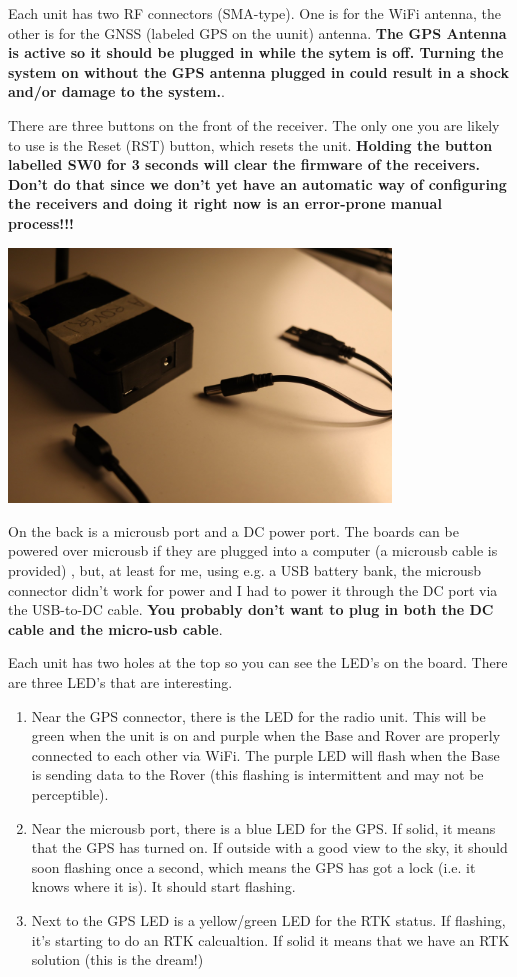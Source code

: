 \documentclass[usletter]{article}
\begin{document}
Each unit has two RF connectors (SMA-type). One is for the WiFi antenna, the
other is for the GNSS (labeled GPS on the uunit) antenna. \textbf{The GPS Antenna is active so it should be
plugged in while the sytem is off. Turning the system on without the GPS
antenna plugged in could result in a shock and/or damage to the system.}. 

There are three buttons on the front of the receiver. The only one you are
likely to use is the Reset (RST) button, which resets the unit.
\textbf{Holding the button labelled SW0 for 3 seconds will clear the firmware
of the receivers. Don't do that since we don't yet have an automatic way of
configuring the receivers and doing it right now  is an error-prone manual
process!!!} 

\begin{center} 
\includegraphics[width=4in]{receiver-back} 
\end{center} 

On the back is a microusb port and a DC power port. The boards can be powered
over microusb if they are plugged into a computer (a microusb cable is
provided) , but, at least for me, using e.g. a USB battery bank, the microusb
connector didn't work for power and I had to power it through the DC port via
the USB-to-DC cable. \textbf{You probably don't want to plug in both the DC
cable and the micro-usb cable}. 

Each unit has two holes at the top so you can see the LED's on the board. There are three LED's that are interesting. 
\begin{enumerate} 
  \item Near the GPS connector, there is the LED for the radio unit. This will be green when the unit is on and purple when the Base and Rover are properly connected to each other via WiFi. The purple LED will flash when the Base is sending data to the Rover (this flashing is intermittent and may not be perceptible). 
  \item Near the microusb port, there is a blue LED for the GPS. If solid, it means that the GPS has turned on. If outside with a good view to the sky, it should soon flashing once a second,  which means the GPS has got a lock (i.e. it knows where it is). It should start flashing. 
  \item Next to the GPS LED is a yellow/green LED for the RTK status. If flashing, it's starting to do an RTK calcualtion. If solid it means that we have an RTK solution (this is the dream!)
\end{enumerate}
\end{document}
